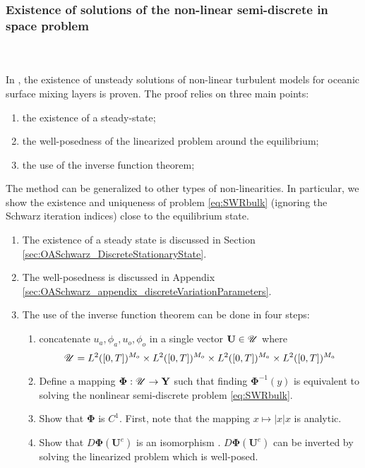 \subsubsection{Existence of solutions of the
non-linear semi-discrete in space problem}
\\
\\
In \citep{chacon-rebollo_existence_2014},
the existence of unsteady solutions of
non-linear turbulent models for oceanic surface mixing layers is
proven.
The proof relies on three main points:
\begin{enumerate}
	\item the existence of a steady-state;
	\item the well-posedness of the linearized problem
	around the equilibrium;
	\item the use of the inverse function theorem;
\end{enumerate}
The method can be generalized to other types of
non-linearities. In particular, we show the existence and
uniqueness of problem \eqref{eq:SWRbulk}
(ignoring the Schwarz iteration indices) close to the
equilibrium state.
\begin{enumerate}
	\item The existence of a steady state is discussed in
	Section \ref{sec:OASchwarz_DiscreteStationaryState}.
	\item The well-posedness is discussed in Appendix
	\ref{sec:OASchwarz_appendix_discreteVariationParameters}.
	\item The use of the inverse function theorem can be
		done in four steps:
	\begin{enumerate}
		\item concatenate $u_a, \phi_a, u_o, \phi_o$ in
		a single vector $\mathbf{U}\in \mathbf{\cal U}$
		where
		\begin{equation}
			\mathbf{\cal U} = L^2([0,T])^{M_o} \times
			L^2([0,T])^{M_o} \times L^2([0,T])^{M_a}
			\times L^2([0,T])^{M_a}
		\end{equation}
		\item
		Define a mapping
		$\mathbf{\Phi}: \mathbf{\cal U}\rightarrow \mathbf{Y}$
		such that finding $\mathbf{\Phi}^{-1}(y)$ is equivalent
		to solving the nonlinear semi-discrete problem
			\eqref{eq:SWRbulk}.
		\item Show that $\mathbf{\Phi}$ is $C^1$.
			First, note that the mapping
			$x \mapsto |x|x$ is analytic.
		\item Show that $D\mathbf{\Phi}(\mathbf{U}^e)$
			is an isomorphism .
		$D\mathbf{\Phi}(\mathbf{U}^e)$ can
		be inverted by solving the linearized problem which
		is well-posed.
	\end{enumerate}
\end{enumerate}
